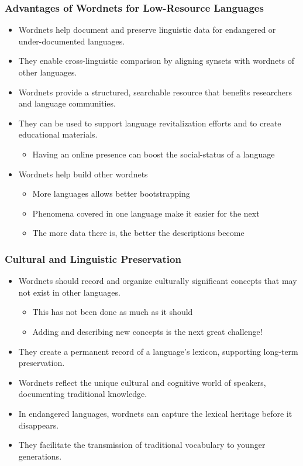 \documentclass[xetex]{beamer}  %
\begin{document}
\begin{frame}
\frametitle{Advantages of Wordnets for Low-Resource Languages}

\begin{itemize}
    \item Wordnets help document and preserve linguistic data for endangered or under-documented languages.
    \item They enable cross-linguistic comparison by aligning synsets with wordnets of other languages.
    \item Wordnets provide a structured, searchable resource that benefits researchers and language communities.
    \item They can be used to support language revitalization efforts and to create educational materials.
      \begin{itemize}
      \item Having an online presence can boost the social-status of a language
      \end{itemize}
    \item Wordnets help build other wordnets
      \begin{itemize}
      \item More languages allows better bootstrapping
      \item Phenomena covered in one language make it easier for the next
      \item The more data there is, the better the descriptions become
      \end{itemize}
\end{itemize}
\end{frame}

\begin{frame}
\frametitle{Cultural and Linguistic Preservation}

\begin{itemize}
\item Wordnets should record and organize culturally significant concepts that may not exist in other languages.
  \begin{itemize}
  \item This has not been done as much as it should
  \item Adding and describing new concepts is the next great challenge!
  \end{itemize}
    \item They create a permanent record of a language's lexicon, supporting long-term preservation.
    \item Wordnets reflect the unique cultural and cognitive world of speakers, documenting traditional knowledge.
    \item In endangered languages, wordnets can capture the lexical heritage before it disappears.
    \item They facilitate the transmission of traditional vocabulary to younger generations.
\end{itemize}
\end{frame}
\end{document}
